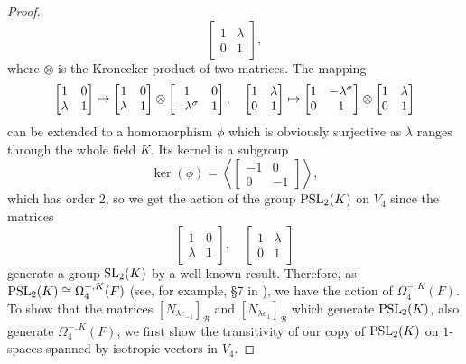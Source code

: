 \begin{proof}
\begin{equation*}
\begin{bmatrix}
			1 & \lambda \\
			0 & 1
		\end{bmatrix},
	\end{equation*}
	where $\otimes$ is the Kronecker product of two matrices. The mapping
	\begin{equation*}
		\begin{bmatrix}
			1 & 0 \\
			\lambda & 1 
		\end{bmatrix} \mapsto
		\begin{bmatrix}
			1 & 0 \\
			\lambda & 1
		\end{bmatrix} \otimes
		\begin{bmatrix}
			1 & 0 \\
			-\lambda^{\sigma} & 1
		\end{bmatrix},\quad 
		\begin{bmatrix}
			1 & \lambda \\
			0 & 1
		\end{bmatrix} \mapsto
		\begin{bmatrix}
			1 & -\lambda^{\sigma} \\
			0 & 1
		\end{bmatrix} \otimes
		\begin{bmatrix}
			1 & \lambda \\
			0 & 1
		\end{bmatrix}
	\end{equation*}
	can be extended to a homomorphism $\phi$ which is obviously surjective as $\lambda$
	 ranges
	through the whole field $K$. Its kernel is a subgroup
	\begin{equation*}
		\ker(\phi) = 
		\left\langle
			\begin{bmatrix}
				-1 & 0 \\
				0 & -1
			\end{bmatrix}
		\right\rangle,
	\end{equation*}
	which has order $2$, so we get the action of the group $\mathrm{PSL}_2(K)$ on $V_4$ since
	the matrices
	\begin{equation*}
		\begin{bmatrix}
			1 & 0 \\
			\lambda & 1
		\end{bmatrix},\quad
		\begin{bmatrix}
			1 & \lambda \\
			0 & 1 
		\end{bmatrix}
	\end{equation*}
	generate a group $\mathrm{SL}_2(K)$ by a well-known result.
	Therefore, as $\mathrm{PSL}_2(K) \cong \Omega_4^{-,K}(F)$ (see, for example, \S 7 in \cite{Waerden}), 
	we have the action of $\Omega_4^{-,K}(F)$. To show that the matrices $[N_{\lambda e_{-1}}]_{\mathcal{B}}$ and
	$[N_{\lambda e_{1}}]_{\mathcal{B}}$ which generate $\mathrm{PSL}_2(K)$, also generate $\Omega_4^{-,K}(F)$, we first 
	show the transitivity of our copy of $\mathrm{PSL}_2(K)$ on $1$-spaces spanned by isotropic vectors in $V_4$.
	

\end{proof}
